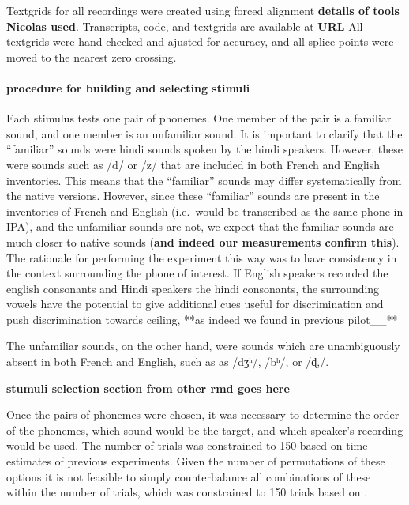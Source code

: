 \documentclass[]{article}
\let\oldparagraph\paragraph
\renewcommand{\paragraph}[1]{\oldparagraph{#1}\mbox{}}
\begin{document}
Textgrids for all recordings were created using forced alignment
\textbf{details of tools Nicolas used}. Transcripts, code, and textgrids
are available at \textbf{URL} All textgrids were hand checked and
ajusted for accuracy, and all splice points were moved to the nearest
zero crossing.

\hypertarget{procedure-for-building-and-selecting-stimuli}{%
\paragraph{procedure for building and selecting
stimuli}\label{procedure-for-building-and-selecting-stimuli}}

Each stimulus tests one pair of phonemes. One member of the pair is a
familiar sound, and one member is an unfamiliar sound. It is important
to clarify that the ``familiar'' sounds were hindi sounds spoken by the
hindi speakers. However, these were sounds such as /d/ or /z/ that are
included in both French and English inventories. This means that the
``familiar'' sounds may differ systematically from the native versions.
However, since these ``familiar'' sounds are present in the inventories
of French and English (i.e.~would be transcribed as the same phone in
IPA), and the unfamiliar sounds are not, we expect that the familiar
sounds are much closer to native sounds (\textbf{and indeed our
measurements confirm this}). The rationale for performing the experiment
this way was to have consistency in the context surrounding the phone of
interest. If English speakers recorded the english consonants and Hindi
speakers the hindi consonants, the surrounding vowels have the potential
to give additional cues useful for discrimination and push
discrimination towards ceiling, **as indeed we found in previous
pilot\_\_**

The unfamiliar sounds, on the other hand, were sounds which are
unambiguously absent in both French and English, such as as /dʒʰ/, /bʰ/,
or /ɖ,/.

\textbf{stumuli selection section from other rmd goes here}

Once the pairs of phonemes were chosen, it was necessary to determine
the order of the phonemes, which sound would be the target, and which
speaker's recording would be used. The number of trials was constrained
to 150 based on time estimates of previous experiments. Given the number
of permutations of these options it is not feasible to simply
counterbalance all combinations of these within the number of trials,
which was constrained to 150 trials based on .
\end{document}
